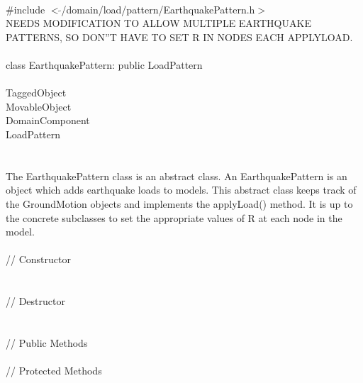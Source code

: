 
   \\
\indent \#include $<\tilde{ }$/domain/load/pattern/EarthquakePattern.h$>$  \\

NEEDS MODIFICATION TO ALLOW MULTIPLE EARTHQUAKE PATTERNS, SO DON''T
HAVE TO SET R IN NODES EACH APPLYLOAD.\\

  \\
\indent class EarthquakePattern: public LoadPattern  \\

 \\
\indent TaggedObject \\
\indent MovableObject \\
\indent\indent DomainComponent \\
\indent\indent\indent LoadPattern \\
\indent\indent\indent{} \\

 \\ 
\indent The EarthquakePattern class is an abstract class. An
EarthquakePattern is an object which adds earthquake loads to
models. This abstract class keeps track of the GroundMotion objects
and implements the applyLoad() method. It is up to the concrete
subclasses to set the appropriate values of \p R at each node in
the model.\\

 \\
\indent // Constructor \\ 
\\ \\
\indent // Destructor \\ 
\\  \\
\indent // Public Methods \\ 
 \\ 
\indent // Protected Methods \\ \\
 \\


